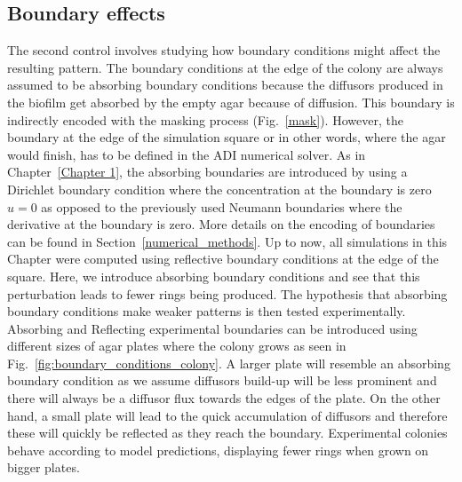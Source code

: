 \subsection{Boundary effects}
The second control involves studying how boundary conditions might affect the resulting pattern.
The boundary conditions at the edge of the colony are always assumed to be absorbing boundary conditions because the diffusors produced in the biofilm get absorbed by the empty agar because of diffusion.
This boundary is indirectly encoded with the masking process (Fig.~\ref{mask}).
However, the boundary at the edge of the simulation square or in other words, where the agar would finish, has to be defined in the ADI numerical solver.
As in Chapter~\ref{Chapter 1}, the absorbing boundaries are introduced by using a Dirichlet boundary condition where the concentration at the boundary is zero $u=0$ as opposed to the previously used Neumann boundaries where the derivative at the boundary is zero.
More details on the encoding of boundaries can be found in Section~\ref{numerical_methods}.
Up to now, all simulations in this Chapter were computed using reflective boundary conditions at the edge of the square.
Here, we introduce absorbing boundary conditions and see that this perturbation leads to fewer rings being produced.
The hypothesis that absorbing boundary conditions make weaker patterns is then tested experimentally.
Absorbing and Reflecting experimental boundaries can be introduced using different sizes of agar plates where the colony grows as seen in Fig.~\ref{fig:boundary_conditions_colony}.
A larger plate will resemble an absorbing boundary condition as we assume diffusors build-up will be less prominent and there will always be a diffusor flux towards the edges of the plate.
On the other hand, a small plate will lead to the quick accumulation of diffusors and therefore these will quickly be reflected as they reach the boundary.
Experimental colonies behave according to model predictions, displaying fewer rings when grown on bigger plates.


